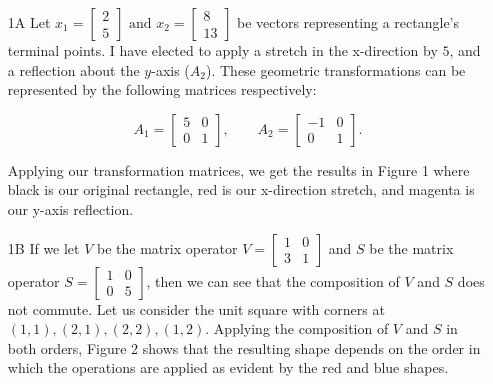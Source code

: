 \documentclass[10pt]{article}
\begin{document}
\noindent{}
\normalsize
\begin{enumerate}[leftmargin=\labelsep]
    \item[1A] Let $x_1 = \begin{bmatrix} 2 \\ 5 \end{bmatrix} \text{ and } x_2 = \begin{bmatrix} 8 \\ 13 \end{bmatrix}$ be vectors representing a rectangle's terminal points. 
    I have elected to apply a stretch in the x-direction by $5$, and a reflection about the $y$-axis ($A_2$). These geometric transformations
    can be represented by the following matrices respectively:
    
    \[
        A_1 = 
        \begin{bmatrix}
            5 & 0 \\
            0 & 1
        \end{bmatrix}
        ,
        \qquad A_2 =
        \begin{bmatrix}
            -1 & 0 \\
            0 & 1
        \end{bmatrix}
        .
    \]
    
    Applying our transformation matrices, we get the results in Figure 1 where black is our original rectangle, red is our x-direction stretch, and magenta is our y-axis reflection.

    \item[1B] If we let $V$ be the matrix operator $V = \begin{bmatrix} 1 & 0 \\ 3 & 1 \end{bmatrix}$ and $S$ be the matrix operator $S = \begin{bmatrix} 1 & 0 \\ 0 & 5 \end{bmatrix}$, then we can see that the composition of $V$ and $S$ does not commute.
    Let us consider the unit square with corners at $(1, 1), (2, 1), (2, 2), (1, 2)$. Applying the composition of $V$ and $S$ in both orders, Figure 2 shows that the resulting shape depends on the order in which the operations are applied as evident by the red and blue shapes.
    

\end{enumerate}
\end{document}
